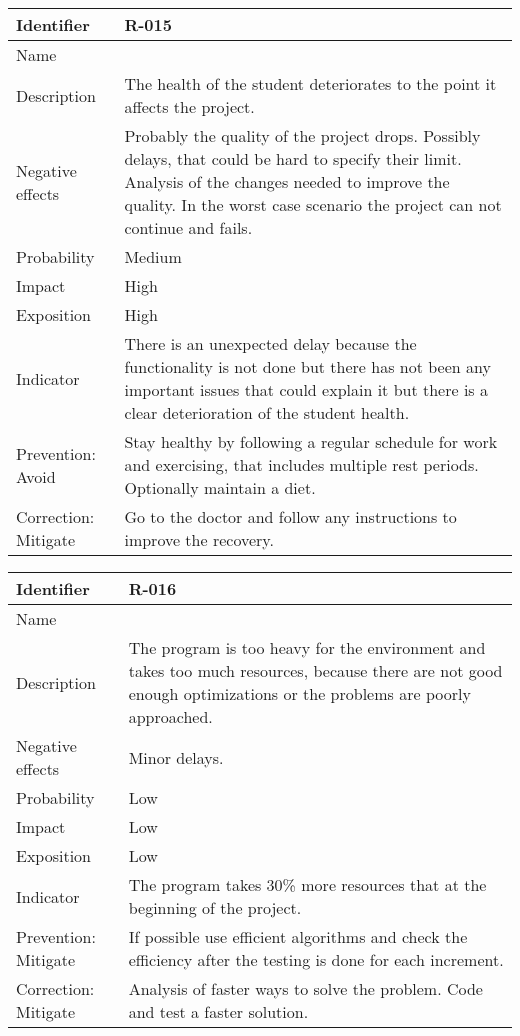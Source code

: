 \begin{table}[H]
	\begin{tabularx}{\textwidth}{|y|z|}
		\hline
		Identifier & \textbf{R-015} \\ \hline
		Name & \Rquince \\ \hline
		Description &
			The health of the student deteriorates to the point it affects the project.
		\\ \hline
		Negative effects &
			Probably the quality of the project drops. \linej
			Possibly delays, that could be hard to specify their limit. \linej
			Analysis of the changes needed to improve the quality. \linej
			In the worst case scenario the project can not continue and fails.
		\\ \hline
		Probability & Medium\\ \hline
		Impact &  High\\ \hline
		Exposition &  High\\ \hline
		Indicator & There is an unexpected delay because the functionality is not done but there has not been any important issues that could explain it but there is a clear deterioration of the student health. \\ \hline
		Prevention: Avoid &
			Stay healthy by following a regular schedule for work and exercising, that includes multiple rest periods. \linej
			Optionally maintain a diet.
		\\ \hline
		Correction: Mitigate &
			Go to the doctor and follow any instructions to improve the recovery.
		\\ \hline
	\end{tabularx}
\end{table}

\begin{table}[H]
	\begin{tabularx}{\textwidth}{|y|z|}
		\hline
		Identifier & \textbf{R-016} \\ \hline
		Name & \Rdieciseis \\ \hline
		Description &
			The program is too heavy for the environment and takes too much resources, because there are not good enough optimizations or the problems are poorly approached.
		\\ \hline
		Negative effects &
			Minor delays. \linej
		\\ \hline
		Probability & Low\\ \hline
		Impact &  Low\\ \hline
		Exposition &  Low\\ \hline
		Indicator & The program takes 30\% more resources that at the beginning of the project.\\ \hline
		Prevention: Mitigate &
			If possible use efficient algorithms and check the efficiency after the testing is done for each increment.
		\\ \hline
		Correction: Mitigate &
			Analysis of faster ways to solve the problem.\linej
			Code and test a faster solution.
		\\ \hline
	\end{tabularx}
\end{table}

